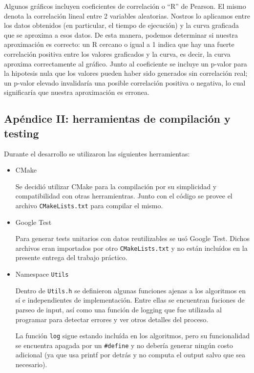 	Algunos gráficos incluyen coeficientes de correlación o ``R'' de Pearson. El mismo denota la correlación lineal entre 2 variables aleatorias. Nostros lo aplicamos entre los datos obtenidos (en particular, el tiempo de ejecución) y la curva graficada que se aproxima a esos datos. De esta manera, podemos determinar si nuestra aproximación es correcto: un R cercano o igual a 1 indica que hay una fuerte correlación positiva entre los valores graficados y la curva, es decir, la curva aproxima correctamente al gráfico. Junto al coeficiente se incluye un p-valor para la hipotesis nula que los valores pueden haber sido generados sin correlación real; un p-valor elevado invalidaría una posible correlación positiva o negativa, lo cual significaría que nuestra aproximación es erronea.

	\subsection{Apéndice II: herramientas de compilación y testing}
	Durante el desarrollo se utilizaron las siguientes herramientas:

	\begin{itemize}
		\item CMake

		Se decidió utilizar CMake para la compilación por su simplicidad y compatibilidad con otras herramientras. Junto con el código se provee el archivo \texttt{CMakeLists.txt} para compilar el mismo.

		\item Google Test

		Para generar tests unitarios con datos reutilizables se usó Google Test. Dichos archivos eran importados por otro \texttt{CMakeLists.txt} y no están incluídos en la presente entrega del trabajo práctico.

		\item Namespace \texttt{Utils}

		Dentro de \texttt{Utils.h} se definieron algunas funciones ajenas a los algoritmos en sí e independientes de implementación. Entre ellas se encuentran fuciones de parseo de input, así como una función de logging que fue utilizada al programar para detectar errores y ver otros detalles del proceso.

		La función \texttt{log} sigue estando incluída en los algoritmos, pero su funcionalidad se encuentra apagada por un \texttt{\#define} y no debería generar ningún costo adicional (ya que usa printf por detrás y no computa el output salvo que sea necesario).
	\end{itemize}